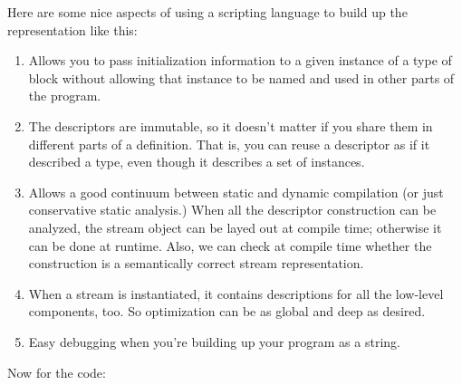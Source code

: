 Here are some nice aspects of using a scripting language to build up the
representation like this:

\begin{enumerate}

\item Allows you to pass initialization information to a given instance
of a type of block without allowing that instance to be named and used
in other parts of the program.

\item The descriptors are immutable, so it doesn't matter if you share
them in different parts of a definition.  That is, you can reuse a
descriptor as if it described a type, even though it describes a set of
instances.

\item Allows a good continuum between static and dynamic compilation (or
just conservative static analysis.)  When all the descriptor
construction can be analyzed, the stream object can be layed out at
compile time; otherwise it can be done at runtime.  Also, we can check
at compile time whether the construction is a semantically correct
stream representation.

\item When a stream is instantiated, it contains descriptions for all
the low-level components, too.  So optimization can be as global and
deep as desired.

\item Easy debugging when you're building up your program as a string.

\end{enumerate}

Now for the code: \\ \\

\begin{lgrind}

\end{lgrind}



